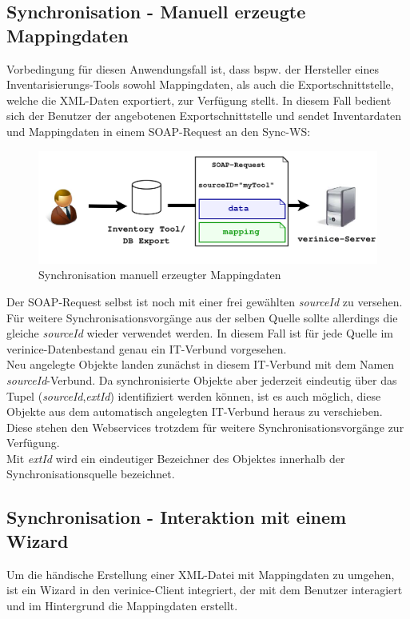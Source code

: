 \documentclass[a4paper,10pt]{book}
\begin{document}
\subsection{Synchronisation - Manuell erzeugte Mappingdaten}
Vorbedingung für diesen Anwendungsfall ist, dass bspw. der Hersteller eines Inventarisierungs-Tools sowohl
Mappingdaten, als auch die Exportschnittstelle, welche die XML-Daten exportiert, zur Verfügung stellt.
In diesem Fall bedient sich der Benutzer der angebotenen Exportschnittstelle und sendet Inventardaten und
Mappingdaten in einem SOAP-Request an den Sync-WS:
\newline
\begin{figure}[htb!]
  \centering
  \includegraphics[scale=.3]{Screenshot/Use_case_db_export.png}
  \caption{\label{Synchronisation manuell erzeugter Mappingdaten} Synchronisation manuell erzeugter Mappingdaten}
\end{figure}
\newline
Der SOAP-Request selbst ist noch mit einer frei gewählten \textit{sourceId} zu versehen. Für weitere
Synchronisationsvorgänge aus der selben Quelle sollte allerdings die gleiche \textit{sourceId} wieder verwendet werden.
In diesem Fall ist für jede Quelle im verinice-Datenbestand genau ein IT-Verbund vorgesehen.
\newline\\
Neu angelegte Objekte landen zunächst in diesem IT-Verbund mit dem Namen \textit{sourceId}-Verbund. Da synchronisierte
Objekte aber jederzeit eindeutig über das Tupel (\textit{sourceId},\textit{extId}) identifiziert werden können, ist es auch möglich,
diese Objekte aus dem automatisch angelegten IT-Verbund heraus zu verschieben. Diese stehen den Webservices trotzdem für weitere Synchronisationsvorgänge zur Verfügung.
\newline\\
Mit \textit{extId} wird ein eindeutiger Bezeichner des Objektes innerhalb der Synchronisationsquelle bezeichnet.

\subsection{Synchronisation - Interaktion mit einem Wizard}
Um die händische Erstellung einer XML-Datei mit Mappingdaten zu umgehen, ist ein
Wizard in den verinice-Client integriert, der mit dem Benutzer interagiert und
im Hintergrund die Mappingdaten erstellt.
\end{document}
